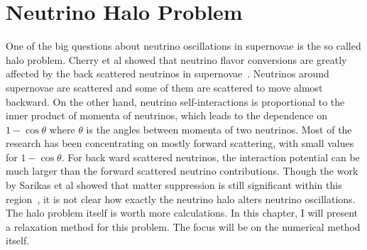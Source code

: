 










\section{\label{chap:halo}Neutrino Halo Problem}


One of the big questions about neutrino oscillations in supernovae is the so called halo problem. Cherry et al showed that neutrino flavor conversions are greatly affected by the back scattered neutrinos in supernovae~\cite{Cherry2012}. Neutrinos around supernovae are scattered and some of them are scattered to move almost backward. On the other hand, neutrino self-interactions is proportional to the inner product of momenta of neutrinos, which leads to the dependence on $1-\cos\theta$ where $\theta$ is the angles between momenta of two neutrinos. Most of the research has been concentrating on mostly forward scattering, with small values for $1-\cos\theta$. For back ward scattered neutrinos, the interaction potential can be much larger than the forward scattered neutrino contributions. Though the work by Sarikas et al showed that matter suppression is still significant within this region~\cite{Sarikas2012a}, it is not clear how exactly the neutrino halo alters neutrino oscillations. The halo problem itself is worth more calculations. In this chapter, I will present a relaxation method for this problem. The focus will be on the numerical method itself.


